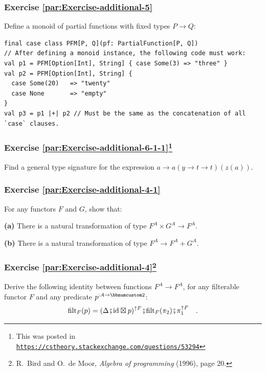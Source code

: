 \subsubsection{Exercise \label{par:Exercise-additional-5}\ref{par:Exercise-additional-5}}

Define a monoid of partial functions with fixed types $P\rightarrow Q$:
\begin{lstlisting}
final case class PFM[P, Q](pf: PartialFunction[P, Q])
// After defining a monoid instance, the following code must work:
val p1 = PFM[Option[Int], String] { case Some(3) => "three" }
val p2 = PFM[Option[Int], String] {
  case Some(20)   => "twenty"
  case None       => "empty"
}
val p3 = p1 |+| p2 // Must be the same as the concatenation of all `case` clauses.
\end{lstlisting}


\subsubsection{Exercise \label{par:Exercise-additional-6-1-1}\ref{par:Exercise-additional-6-1-1}\protect\footnote{This was posted in \texttt{\protect\href{https://cstheory.stackexchange.com/questions/53294}{https://cstheory.stackexchange.com/questions/53294}}}}

Find a general type signature for the expression $a\rightarrow a(y\rightarrow t\rightarrow t)(z(a))$. 

\subsubsection{Exercise \label{par:Exercise-additional-4-1}\ref{par:Exercise-additional-4-1}}

For any functors $F$ and $G$, show that:

\textbf{(a)} There is a natural transformation of type $F^{A}\times G^{A}\rightarrow F^{A}$.

\textbf{(b)} There is a natural transformation of type $F^{A}\rightarrow F^{A}+G^{A}$.

\subsubsection{Exercise \label{par:Exercise-additional-4}\ref{par:Exercise-additional-4}\protect\footnote{R.~Bird and O.~de Moor, \emph{Algebra of programming} (1996), page
20.}}

Derive the following identity between functions $F^{A}\rightarrow F^{A}$,
for any filterable functor $F$ and any predicate $p^{:A\rightarrow\bbnum 2}$:
\[
\text{filt}_{F}(p)=(\Delta\bef\text{id}\boxtimes p)^{\uparrow F}\bef\text{filt}_{F}(\pi_{2})\bef\pi_{1}^{\uparrow F}\quad.
\]


